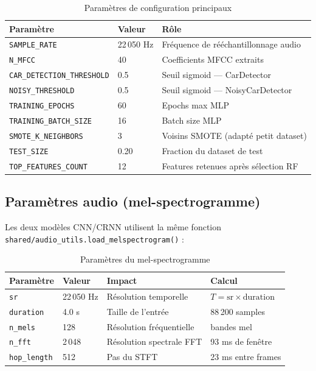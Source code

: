 \documentclass[11pt,a4paper]{article}
\newcommand{\file}[1]{\texttt{\small #1}}
\newcommand{\param}[1]{\texttt{#1}}
\begin{document}
\begin{table}[h!]
\centering
\renewcommand{\arraystretch}{1.3}
\begin{tabular}{lll}
\toprule
\textbf{Paramètre} & \textbf{Valeur} & \textbf{Rôle} \\
\midrule
\param{SAMPLE\_RATE}          & 22\,050 Hz   & Fréquence de rééchantillonnage audio \\
\param{N\_MFCC}               & 40           & Coefficients MFCC extraits \\
\param{CAR\_DETECTION\_THRESHOLD} & 0.5      & Seuil sigmoid — CarDetector \\
\param{NOISY\_THRESHOLD}      & 0.5          & Seuil sigmoid — NoisyCarDetector \\
\param{TRAINING\_EPOCHS}      & 60           & Epochs max MLP \\
\param{TRAINING\_BATCH\_SIZE} & 16           & Batch size MLP \\
\param{SMOTE\_K\_NEIGHBORS}   & 3            & Voisins SMOTE (adapté petit dataset) \\
\param{TEST\_SIZE}            & 0.20         & Fraction du dataset de test \\
\param{TOP\_FEATURES\_COUNT}  & 12           & Features retenues après sélection RF \\
\bottomrule
\end{tabular}
\caption{Paramètres de configuration principaux}
\end{table}

\subsection{Paramètres audio (mel-spectrogramme)}

Les deux modèles CNN/CRNN utilisent la même fonction
\file{shared/audio\_utils.load\_melspectrogram()} :

\begin{table}[h!]
\centering
\renewcommand{\arraystretch}{1.3}
\begin{tabular}{llll}
\toprule
\textbf{Paramètre} & \textbf{Valeur} & \textbf{Impact} & \textbf{Calcul} \\
\midrule
\param{sr}         & 22\,050 Hz & Résolution temporelle & $T = \text{sr} \times \text{duration}$ \\
\param{duration}   & 4.0 s      & Taille de l'entrée     & 88\,200 samples \\
\param{n\_mels}    & 128        & Résolution fréquentielle & bandes mel \\
\param{n\_fft}     & 2\,048     & Résolution spectrale FFT & 93 ms de fenêtre \\
\param{hop\_length}& 512        & Pas du STFT            & 23 ms entre frames \\
\bottomrule
\end{tabular}
\caption{Paramètres du mel-spectrogramme}
\end{table}
\end{document}
